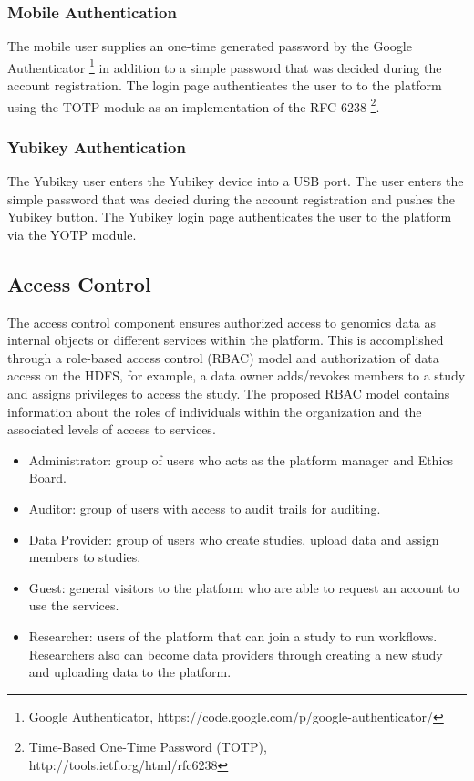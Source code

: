 \vspace{-5mm}
\subsubsection {Mobile Authentication}
The mobile user supplies an one-time generated password by the Google Authenticator \footnote{Google Authenticator, https://code.google.com/p/google-authenticator/} in addition to a simple password that was decided during the account registration. The login page authenticates the user to to the platform using the TOTP module as an implementation of the RFC 6238 \footnote{Time-Based One-Time Password (TOTP), http://tools.ietf.org/html/rfc6238}.   

\vspace{-5mm}
\subsubsection {Yubikey Authentication}
The Yubikey user enters the Yubikey device into a USB port. The user enters the simple password that was decied during the account registration and pushes the Yubikey button. The Yubikey login page authenticates the user to the platform via the YOTP module.

\vspace{-2mm}
\subsection {Access Control}
The access control component ensures authorized access to genomics data as internal objects or different services within the platform. This is accomplished through a role-based access control (RBAC) model and authorization of data access on the HDFS, for example, a data owner adds/revokes members to a study and assigns privileges to access the study.
% 
The proposed RBAC model contains information about the roles of individuals within the organization and the associated levels of access to services.
\begin{itemize}
\item Administrator: group of users who acts as the platform manager and Ethics Board.
\item Auditor: group of users with access to audit trails for auditing.
\item Data Provider: group of users who create studies, upload data and assign members to studies.
\item Guest: general visitors to the platform who are able to request an account to use the services.
\item Researcher: users of the platform that can join a study to run workflows. Researchers also can become data providers through creating a new study and uploading data to the platform.
\end{itemize}

